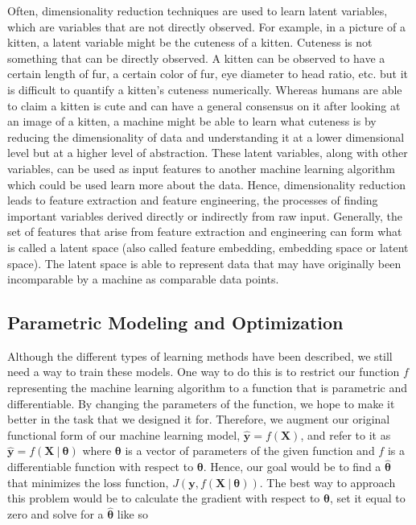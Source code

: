 Often, dimensionality reduction techniques are used to learn latent variables, which  are variables that are not directly observed. For example, in a picture of a kitten, a latent variable might be the cuteness of a kitten. Cuteness is not something that can be directly observed. A kitten can be observed to have a certain length of fur, a certain color of fur, eye diameter to head ratio, etc. but it is difficult to quantify a kitten's cuteness numerically. Whereas humans are able to claim a kitten is cute and can have a general consensus on it after looking at an image of a kitten, a machine might be able to learn what cuteness is by reducing the dimensionality of data and understanding it at a lower dimensional level but at a higher level of abstraction. These latent variables, along with other variables, can be used as input features to another machine learning algorithm which could be used learn more about the data. Hence, dimensionality reduction leads to feature extraction and feature engineering, the processes of finding important variables derived directly or indirectly from raw input. Generally, the set of features that arise from feature extraction and engineering can form what is called a latent space (also called feature embedding, embedding space or latent space). The latent space is able to represent data that may have originally been incomparable by a machine as comparable data points.
\subsection{Parametric Modeling and Optimization}
\label{paramsmodeling}

Although the different types of learning methods have been described, we still need a way to train these models. One way to do this is to restrict our function $f$ representing the machine learning algorithm to a function that is parametric and differentiable. By changing the parameters of the function, we hope to make it better in the task that we designed it for. Therefore, we augment our original functional form of our machine learning model, $\mathbf{\hat{y}} = f(\mathbf{X})$, and refer to it as $\mathbf{\hat{y}} = f(\mathbf{X} \ | \ \boldsymbol{\theta})$  where $\boldsymbol{\theta}$ is a vector of parameters of the given function and $f$ is a differentiable function with respect to $\boldsymbol{\theta}$. Hence, our goal would be to find a $\boldsymbol{\hat{\theta}}$ that minimizes the loss function, $J(\mathbf{y}, f(\mathbf{X} \ | \ \boldsymbol{\theta}))$. The best way to approach this problem would be to calculate the gradient with respect to $\boldsymbol{\theta}$, set it equal to zero and solve for a $\boldsymbol{\hat{\theta}}$ like so

